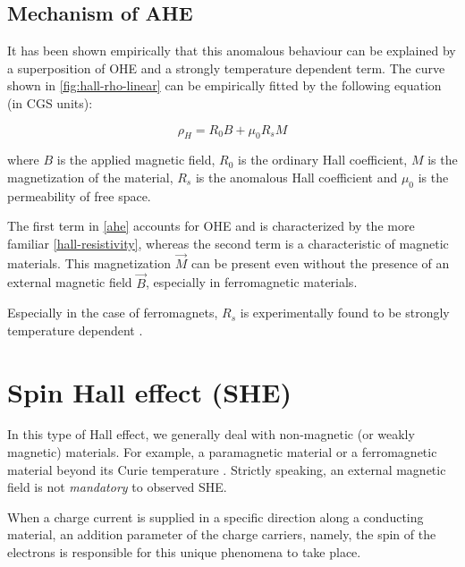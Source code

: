 \subsection{Mechanism of AHE}

It has been shown empirically that this anomalous behaviour can be explained by a superposition of OHE and a strongly temperature dependent term.
The curve shown in \cref{fig:hall-rho-linear}
can be empirically fitted by the following equation (in CGS units):

\begin{equation} \label{ahe}
    \rho_H = R_0 B + \mu_0 R_s M
\end{equation}

where $ B $ is the applied magnetic field, $ R_0 $ is the ordinary Hall coefficient, $ M $ is the magnetization of the material, $ R_s $ is the anomalous Hall coefficient and \( \mu_0 \) is the permeability of free space.

The first term in \cref{ahe} accounts for OHE and is characterized by the more familiar \cref{hall-resistivity}, whereas the second term is a characteristic of magnetic materials.
This magnetization $ \vec{M} $ can be present even without the presence of an external magnetic field $ \vec{B} $, especially in ferromagnetic materials.

Especially in the case of ferromagnets, $ R_s $ is experimentally found to be strongly temperature dependent \cite{hurd2012hall}.


\section{Spin Hall effect (SHE)}

\label{sec:she}

In this type of Hall effect, we generally deal with non-magnetic (or weakly magnetic) materials.
For example, a paramagnetic material or a ferromagnetic material beyond its Curie temperature \cite{hirsch1999spin}.
Strictly speaking, an external magnetic field is not \textit{mandatory} to observed SHE.

When a charge current is supplied in a specific direction along a conducting material, an addition parameter of the charge carriers, namely, the spin of the electrons is responsible for this unique phenomena to take place.


